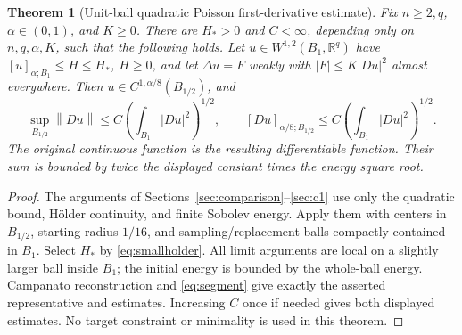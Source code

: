 \documentclass[11pt,a4paper]{article}
\numberwithin{equation}{section}
\newtheorem{theorem}{Theorem}[section]
\theoremstyle{definition}
\theoremstyle{remark}
\newcommand{\R}{\mathbb R}
\newcommand{\norm}[1]{\left\lVert#1\right\rVert}
\begin{document}
\begin{theorem}[Unit-ball quadratic Poisson first-derivative estimate]
\label{thm:c1gate}
Fix \(n\ge2,q\), \(\alpha\in(0,1)\), and \(K\ge0\). There are
\(H_* >0\) and \(C<\infty\), depending only on \(n,q,\alpha,K\),
such that the following holds. Let \(u\in W^{1,2}(B_1,\R^q)\) have
\([u]_{\alpha;B_1}\le H\le H_*\), \(H\ge0\), and let
\(\Delta u=F\) weakly with \(|F|\le K|Du|^2\) almost everywhere.
Then \(u\in C^{1,\alpha/8}(B_{1/2})\), and
\[
\sup_{B_{1/2}}\norm{Du}\le C\left(\int_{B_1}|Du|^2\right)^{1/2},
\qquad [Du]_{\alpha/8;B_{1/2}}
\le C\left(\int_{B_1}|Du|^2\right)^{1/2}.
\]
The original continuous function is the resulting differentiable function.
Their sum is bounded by twice the displayed constant times the energy square root.
\end{theorem}
\begin{proof}
The arguments of Sections~\ref{sec:comparison}--\ref{sec:c1} use only
the quadratic bound, H\"older continuity, and finite Sobolev energy.
Apply them with centers in \(B_{1/2}\), starting radius \(1/16\),
and sampling/replacement balls compactly contained in \(B_1\).
Select \(H_*\) by \eqref{eq:smallholder}. All limit arguments are local
on a slightly larger ball inside \(B_1\); the initial energy is bounded
by the whole-ball energy. Campanato reconstruction and
\eqref{eq:segment} give exactly the asserted representative and estimates.
Increasing \(C\) once if needed gives both displayed estimates. No target
constraint or minimality is used in this theorem.
\end{proof}
\end{document}
